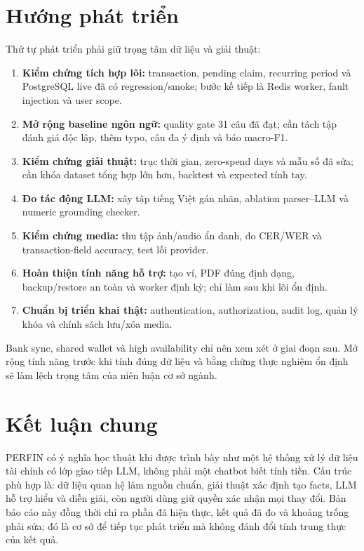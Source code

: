 \section{Hướng phát triển}

Thứ tự phát triển phải giữ trọng tâm dữ liệu và giải thuật:

\begin{enumerate}
  \item \textbf{Kiểm chứng tích hợp lõi:} transaction, pending claim, recurring period và PostgreSQL live đã có regression/smoke; bước kế tiếp là Redis worker, fault injection và user scope.
  \item \textbf{Mở rộng baseline ngôn ngữ:} quality gate 31 câu đã đạt; cần tách tập đánh giá độc lập, thêm typo, câu đa ý định và báo macro-F1.
  \item \textbf{Kiểm chứng giải thuật:} trục thời gian, zero-spend days và mẫu số đã sửa; cần khóa dataset tổng hợp lớn hơn, backtest và expected tính tay.
  \item \textbf{Đo tác động LLM:} xây tập tiếng Việt gán nhãn, ablation parser--LLM và numeric grounding checker.
  \item \textbf{Kiểm chứng media:} thu tập ảnh/audio ẩn danh, đo CER/WER và transaction-field accuracy, test lỗi provider.
  \item \textbf{Hoàn thiện tính năng hỗ trợ:} tạo ví, PDF đúng định dạng, backup/restore an toàn và worker định kỳ; chỉ làm sau khi lõi ổn định.
  \item \textbf{Chuẩn bị triển khai thật:} authentication, authorization, audit log, quản lý khóa và chính sách lưu/xóa media.
\end{enumerate}

Bank sync, shared wallet và high availability chỉ nên xem xét ở giai đoạn sau. Mở rộng tính năng trước khi tính đúng dữ liệu và bằng chứng thực nghiệm ổn định sẽ làm lệch trọng tâm của niên luận cơ sở ngành.

\section{Kết luận chung}

PERFIN có ý nghĩa học thuật khi được trình bày như một hệ thống xử lý dữ liệu tài chính có lớp giao tiếp LLM, không phải một chatbot biết tính tiền. Cấu trúc phù hợp là: dữ liệu quan hệ làm nguồn chuẩn, giải thuật xác định tạo facts, LLM hỗ trợ hiểu và diễn giải, còn người dùng giữ quyền xác nhận mọi thay đổi. Bản báo cáo này đồng thời chỉ ra phần đã hiện thực, kết quả đã đo và khoảng trống phải sửa; đó là cơ sở để tiếp tục phát triển mà không đánh đổi tính trung thực của kết quả.
